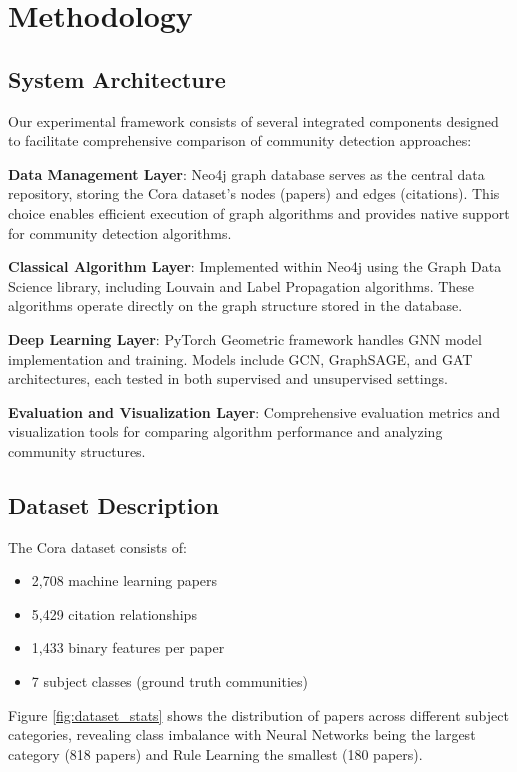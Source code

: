 \documentclass[conference]{IEEEtran}
\begin{document}
\section{Methodology}

\subsection{System Architecture}

Our experimental framework consists of several integrated components designed to facilitate comprehensive comparison of community detection approaches:

\textbf{Data Management Layer}: Neo4j graph database serves as the central data repository, storing the Cora dataset's nodes (papers) and edges (citations). This choice enables efficient execution of graph algorithms and provides native support for community detection algorithms.

\textbf{Classical Algorithm Layer}: Implemented within Neo4j using the Graph Data Science library, including Louvain and Label Propagation algorithms. These algorithms operate directly on the graph structure stored in the database.

\textbf{Deep Learning Layer}: PyTorch Geometric framework handles GNN model implementation and training. Models include GCN, GraphSAGE, and GAT architectures, each tested in both supervised and unsupervised settings.

\textbf{Evaluation and Visualization Layer}: Comprehensive evaluation metrics and visualization tools for comparing algorithm performance and analyzing community structures.

\subsection{Dataset Description}

The Cora dataset consists of:
\begin{itemize}
    \item 2,708 machine learning papers
    \item 5,429 citation relationships
    \item 1,433 binary features per paper
    \item 7 subject classes (ground truth communities)
\end{itemize}

Figure \ref{fig:dataset_stats} shows the distribution of papers across different subject categories, revealing class imbalance with Neural Networks being the largest category (818 papers) and Rule Learning the smallest (180 papers).
\end{document}
